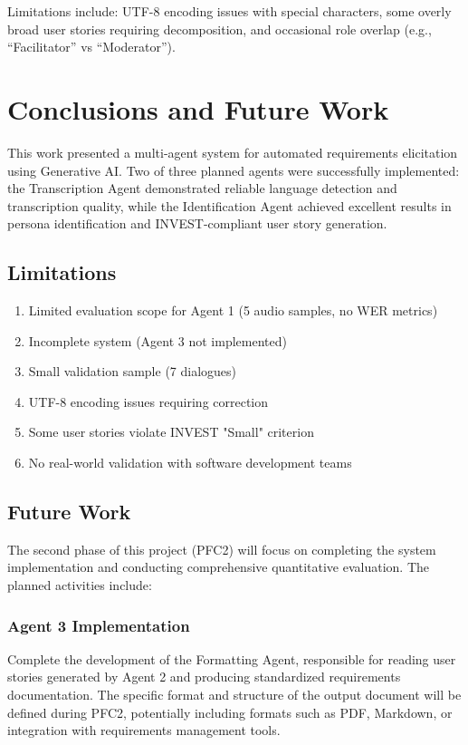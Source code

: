 \documentclass[12pt]{article}
\begin{document}
Limitations include: UTF-8 encoding issues with special characters, some overly broad user stories requiring decomposition, and occasional role overlap (e.g., ``Facilitator'' vs ``Moderator'').


\section{Conclusions and Future Work}
\label{sec:conclusion}

This work presented a multi-agent system for automated requirements elicitation using Generative AI. Two of three planned agents were successfully implemented: the Transcription Agent demonstrated reliable language detection and transcription quality, while the Identification Agent achieved excellent results in persona identification and INVEST-compliant user story generation.

\subsection{Limitations}

\begin{enumerate}
    \item Limited evaluation scope for Agent 1 (5 audio samples, no WER metrics)
    \item Incomplete system (Agent 3 not implemented)
    \item Small validation sample (7 dialogues)
    \item UTF-8 encoding issues requiring correction
    \item Some user stories violate INVEST "Small" criterion
    \item No real-world validation with software development teams
\end{enumerate}

\subsection{Future Work}

The second phase of this project (PFC2) will focus on completing the system implementation and conducting comprehensive quantitative evaluation. The planned activities include:

\subsubsection{Agent 3 Implementation}

Complete the development of the Formatting Agent, responsible for reading user stories generated by Agent 2 and producing standardized requirements documentation. The specific format and structure of the output document will be defined during PFC2, potentially including formats such as PDF, Markdown, or integration with requirements management tools.
\end{document}
